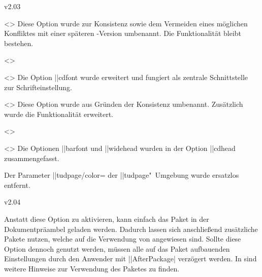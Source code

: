 \begin{Changes}{v2.03}
\begin{Obsolete}
  {}
  <>
\printdeclarationlist
%
Diese Option wurde zur Konsistenz sowie dem Vermeiden eines möglichen 
Konfliktes mit einer späteren \KOMAScript-Version umbenannt. Die Funktionalität 
bleibt bestehen.
\end{Obsolete}

\begin{Obsolete}
  {}
  <>
\begin{Obsolete}
  {}
  <>
\printdeclarationlist
%
Die Option \Option||{cdfont} wurde erweitert und fungiert als zentrale 
Schnittstelle zur Schrifteinstellung. 
\end{Obsolete}
\end{Obsolete}

\begin{Obsolete}
  {}
  <>
\printdeclarationlist
%
Diese Option wurde aus Gründen der Konsistenz umbenannt. Zusätzlich wurde die 
Funktionalität erweitert.
\end{Obsolete}

\begin{Obsolete}
  {}
  <>
\begin{Obsolete}
  {}
  <>
\printdeclarationlist
%
Die Optionen \Option||{barfont} und \Option||{widehead} wurden in der Option 
\Option||{cdhead} zusammengefasst.
\end{Obsolete}
\end{Obsolete}

\begin{Declaration*}
  {}
\begin{Obsolete}
  {}
\printdeclarationlist
%
Der Parameter \Environment||{tudpage/color=} der 
\Environment||{tudpage}"~Umgebung wurde ersatzlos entfernt.
\end{Obsolete}
\end{Declaration*}
\end{Changes}



\begin{Changes}{v2.04}
\begin{Obsolete}
  {}
\printdeclarationlist
%
Anstatt diese Option zu aktivieren, kann einfach das Paket  
in der Dokumentpräambel geladen werden. Dadurch lassen sich anschließend 
zusätzliche Pakete nutzen, welche auf die Verwendung von  
angewiesen sind. Sollte diese Option dennoch genutzt werden, müssen alle auf 
das Paket  aufbauenden Einstellungen durch den Anwender mit 
\Macro||{AfterPackage|\MPValue{\dots}} verzögert werden. In 
 sind weitere Hinweise zur Verwendung des Paketes 
 zu finden.
\end{Obsolete}
\end{Changes}



